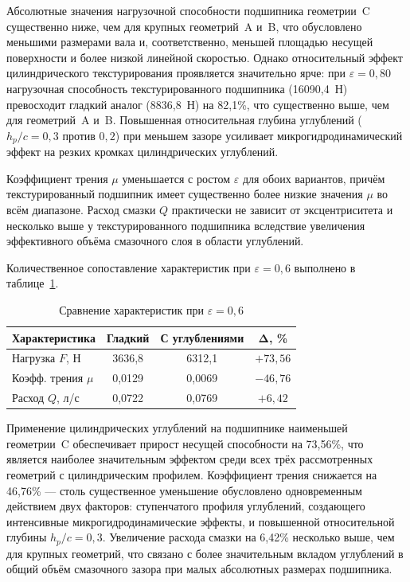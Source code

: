 Абсолютные значения нагрузочной способности подшипника геометрии~C существенно ниже, чем для крупных геометрий~A и~B, что обусловлено меньшими размерами вала и, соответственно, меньшей площадью несущей поверхности и более низкой линейной скоростью. Однако относительный эффект цилиндрического текстурирования проявляется значительно ярче: при $\varepsilon = 0{,}80$ нагрузочная способность текстурированного подшипника (16090{,}4~Н) превосходит гладкий аналог (8836{,}8~Н) на 82{,}1\%, что существенно выше, чем для геометрий~A и~B. Повышенная относительная глубина углублений ($h_p/c = 0{,}3$ против $0{,}2$) при меньшем зазоре усиливает микрогидродинамический эффект на резких кромках цилиндрических углублений.

Коэффициент трения $\mu$ уменьшается с ростом $\varepsilon$ для обоих вариантов, причём текстурированный подшипник имеет существенно более низкие значения $\mu$ во всём диапазоне. Расход смазки $Q$ практически не зависит от эксцентриситета и несколько выше у текстурированного подшипника вследствие увеличения эффективного объёма смазочного слоя в области углублений.

Количественное сопоставление характеристик при $\varepsilon = 0{,}6$ выполнено в таблице~\ref{tab:comparison}.

\begin{table}[H]
\small
\centering
\caption{Сравнение характеристик при $\varepsilon = 0{,}6$}
\label{tab:comparison}
\begin{tabular}{|l|c|c|c|}
\hline
\textbf{Характеристика} & \textbf{Гладкий} & \textbf{С углублениями} & $\boldsymbol{\Delta}$\textbf{, \%} \\
\hline
Нагрузка $F$, Н & 3636{,}8 & 6312{,}1 & $+73{,}56$ \\
\hline
Коэфф. трения $\mu$ & 0{,}0129 & 0{,}0069 & $-46{,}76$ \\
\hline
Расход $Q$, л/с & 0{,}0722 & 0{,}0769 & $+6{,}42$ \\
\hline
\end{tabular}
\end{table}

Применение цилиндрических углублений на подшипнике наименьшей геометрии~C обеспечивает прирост несущей способности на 73{,}56\%, что является наиболее значительным эффектом среди всех трёх рассмотренных геометрий с цилиндрическим профилем. Коэффициент трения снижается на 46{,}76\% --- столь существенное уменьшение обусловлено одновременным действием двух факторов: ступенчатого профиля углублений, создающего интенсивные микрогидродинамические эффекты, и повышенной относительной глубины $h_p/c = 0{,}3$. Увеличение расхода смазки на 6{,}42\% несколько выше, чем для крупных геометрий, что связано с более значительным вкладом углублений в общий объём смазочного зазора при малых абсолютных размерах подшипника.

